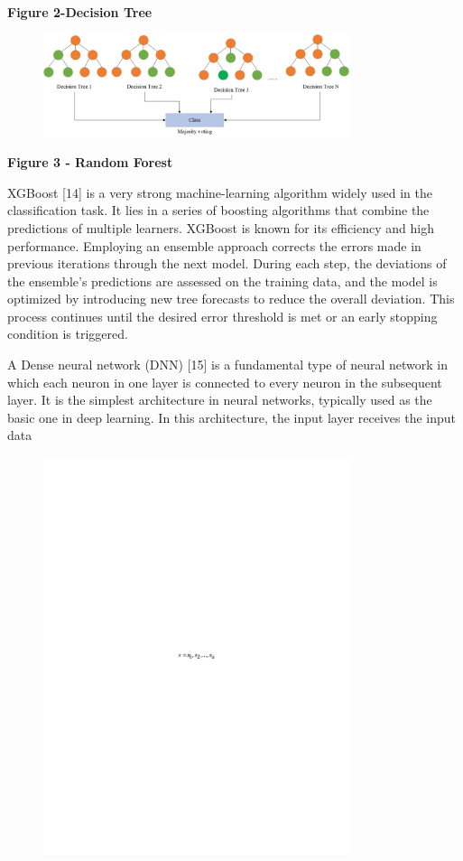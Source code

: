 {\bfseries Figure 2-Decision Tree}

\begin{figure}[H]
	\centering
	\includegraphics[width=0.8\textwidth]{media/ict/image40}
	\caption*{}
\end{figure}


{\bfseries Figure 3 - Random Forest}

XGBoost {[}14{]} is a very strong machine-learning algorithm widely used
in the classification task. It lies in a series of boosting algorithms
that combine the predictions of multiple learners. XGBoost is known for
its efficiency and high performance. Employing an ensemble approach
corrects the errors made in previous iterations through the next model.
During each step, the deviations of the ensemble's predictions are
assessed on the training data, and the model is optimized by introducing
new tree forecasts to reduce the overall deviation. This process
continues until the desired error threshold is met or an early stopping
condition is triggered.

A Dense neural network (DNN) {[}15{]} is a fundamental type of neural
network in which each neuron in one layer is connected to every neuron
in the subsequent layer. It is the simplest architecture in neural
networks, typically used as the basic one in deep learning. In this
architecture, the input layer receives the input data
\begin{figure}[H]
	\centering
	\includegraphics[width=0.8\textwidth]{media/ict/image41}
	\caption*{}
\end{figure}

